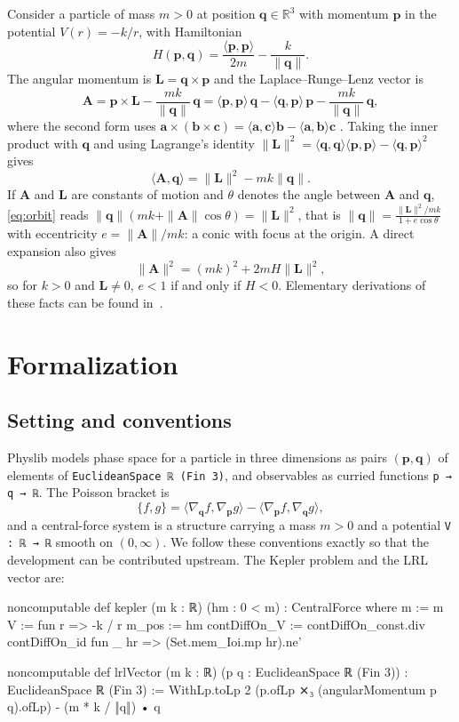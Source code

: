 \documentclass[11pt]{article}
\theoremstyle{definition}
\theoremstyle{remark}
\newcommand{\vA}{\mathbf{A}}
\newcommand{\vL}{\mathbf{L}}
\newcommand{\vp}{\mathbf{p}}
\newcommand{\vq}{\mathbf{q}}
\newcommand{\ip}[2]{\langle #1, #2\rangle}
\begin{document}
Consider a particle of mass $m>0$ at position $\vq\in\mathbb{R}^3$ with momentum $\vp$ in the
potential $V(r)=-k/r$, with Hamiltonian
\[
  H(\vp,\vq)=\frac{\ip{\vp}{\vp}}{2m}-\frac{k}{\|\vq\|}.
\]
The angular momentum is $\vL=\vq\times\vp$ and the Laplace--Runge--Lenz vector is
\[
  \vA=\vp\times\vL-\frac{mk}{\|\vq\|}\,\vq
     =\ip{\vp}{\vp}\,\vq-\ip{\vq}{\vp}\,\vp-\frac{mk}{\|\vq\|}\,\vq ,
\]
where the second form uses $\mathbf a\times(\mathbf b\times\mathbf c)
=\ip{\mathbf a}{\mathbf c}\mathbf b-\ip{\mathbf a}{\mathbf b}\mathbf c$
\cite[\S3.9]{goldstein}. Taking the inner product with $\vq$ and using Lagrange's identity
$\|\vL\|^2=\ip{\vq}{\vq}\ip{\vp}{\vp}-\ip{\vq}{\vp}^2$ gives
\begin{equation}\label{eq:orbit}
  \ip{\vA}{\vq}=\|\vL\|^2-mk\|\vq\| .
\end{equation}
If $\vA$ and $\vL$ are constants of motion and $\theta$ denotes the angle between $\vA$ and
$\vq$, \eqref{eq:orbit} reads $\|\vq\|(mk+\|\vA\|\cos\theta)=\|\vL\|^2$, that is
$\|\vq\|=\frac{\|\vL\|^2/mk}{1+e\cos\theta}$ with eccentricity $e=\|\vA\|/mk$: a conic with
focus at the origin. A direct expansion also gives
\begin{equation}\label{eq:norm}
  \|\vA\|^2=(mk)^2+2mH\|\vL\|^2 ,
\end{equation}
so for $k>0$ and $\vL\neq0$, $e<1$ if and only if $H<0$. Elementary derivations of these facts
can be found in~\cite{goldstein,moriconi2021}.

\section{Formalization}

\subsection{Setting and conventions}\label{sec:defs}

Physlib models phase space for a particle in three dimensions as pairs
$(\vp,\vq)$ of elements of \texttt{EuclideanSpace ℝ (Fin 3)}, and observables as curried functions
\texttt{p → q → ℝ}. The Poisson bracket is
\[
  \{f,g\}=\ip{\nabla_{\vq}f}{\nabla_{\vp}g}-\ip{\nabla_{\vp}f}{\nabla_{\vq}g},
\]
and a central-force system is a structure carrying a mass $m>0$ and a potential
\texttt{V : ℝ → ℝ} smooth on $(0,\infty)$. We follow these conventions exactly so that the
development can be contributed upstream. The Kepler problem and the LRL vector are:

\begin{lean}
noncomputable def kepler (m k : ℝ) (hm : 0 < m) : CentralForce where
  m := m
  V := fun r => -k / r
  m_pos := hm
  contDiffOn_V := contDiffOn_const.div contDiffOn_id
    fun _ hr => (Set.mem_Ioi.mp hr).ne'

noncomputable def lrlVector (m k : ℝ) (p q : EuclideanSpace ℝ (Fin 3)) :
    EuclideanSpace ℝ (Fin 3) :=
  WithLp.toLp 2 (p.ofLp ⨯₃ (angularMomentum p q).ofLp) - (m * k / ‖q‖) • q
\end{lean}
\end{document}
